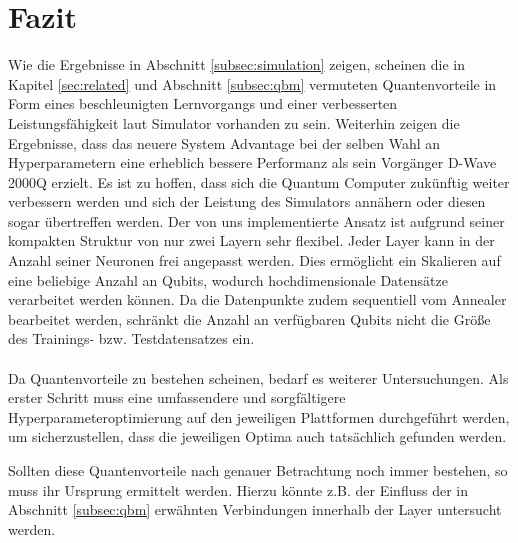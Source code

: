 \section{Fazit} 
\label{sec:conclusion}

Wie die Ergebnisse in Abschnitt \ref{subsec:simulation} zeigen, scheinen die in Kapitel \ref{sec:related} und Abschnitt \ref{subsec:qbm} vermuteten Quantenvorteile in Form eines beschleunigten Lernvorgangs und einer
verbesserten Leistungsfähigkeit laut Simulator vorhanden zu sein. Weiterhin zeigen die Ergebnisse, dass das neuere System Advantage bei der selben Wahl an Hyperparametern eine erheblich bessere Performanz als sein
Vorgänger D-Wave 2000Q erzielt. Es ist zu hoffen, dass sich die Quantum Computer zukünftig weiter verbessern werden und sich der Leistung des Simulators annähern oder diesen sogar übertreffen werden. 
Der von uns implementierte Ansatz ist aufgrund seiner kompakten Struktur von nur zwei Layern sehr flexibel. Jeder Layer kann in der Anzahl seiner Neuronen frei angepasst werden. Dies ermöglicht ein Skalieren auf eine
beliebige Anzahl an Qubits, wodurch hochdimensionale Datensätze verarbeitet werden können. Da die Datenpunkte zudem sequentiell vom Annealer bearbeitet werden, schränkt die Anzahl an verfügbaren Qubits nicht die Größe des
Trainings- bzw. Testdatensatzes ein.\\\\
Da Quantenvorteile zu bestehen scheinen, bedarf es weiterer Untersuchungen. Als erster Schritt muss eine umfassendere und sorgfältigere Hyperparameteroptimierung auf den jeweiligen Plattformen durchgeführt werden, um
sicherzustellen, dass die jeweiligen Optima auch tatsächlich gefunden werden.

Sollten diese Quantenvorteile nach genauer Betrachtung noch immer bestehen, so muss ihr Ursprung ermittelt werden. Hierzu könnte z.B. der Einfluss der in Abschnitt \ref{subsec:qbm} erwähnten Verbindungen innerhalb der Layer untersucht werden.
